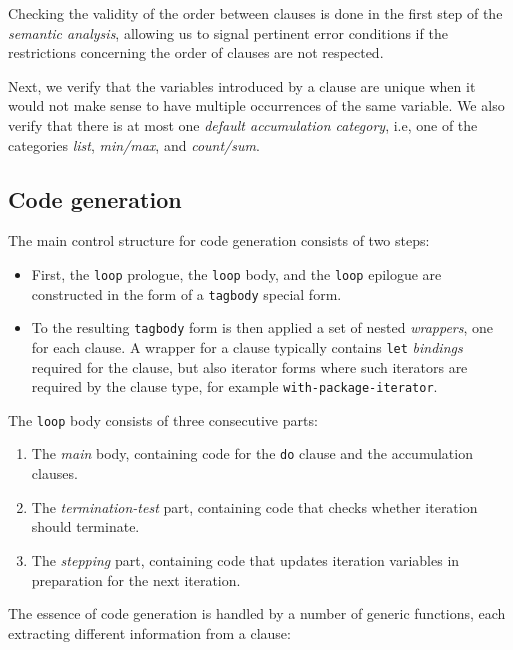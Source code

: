 Checking the validity of the order between clauses is done in the
first step of the \emph{semantic analysis}, allowing us to signal
pertinent error conditions if the restrictions concerning the order of
clauses are not respected.

Next, we verify that the variables introduced by a clause are unique
when it would not make sense to have multiple occurrences of the same
variable.  We also verify that there is at most one \emph{default
accumulation category}, i.e, one of the categories \emph{list},
\emph{min/max}, and \emph{count/sum}.

\subsection{Code generation}
\label{sec-our-technique-code generation}

The main control structure for code generation consists of two steps:

\begin{itemize}
\item First, the \texttt{loop} prologue, the \texttt{loop} body, and
  the \texttt{loop} epilogue are constructed in the form of a
  \texttt{tagbody} special form.
\item To the resulting \texttt{tagbody} form is then applied a set of
  nested \emph{wrappers}, one for each clause.  A wrapper for a clause
  typically contains \texttt{let} \emph{bindings} required for the
  clause, but also iterator forms where such iterators are required by
  the clause type, for example \texttt{with-package-iterator}.
\end{itemize}

The \texttt{loop} body consists of three consecutive parts:

\begin{enumerate}
\item The \emph{main} body, containing code for the \texttt{do} clause
  and the accumulation clauses.
\item The \emph{termination-test} part, containing code that checks
  whether iteration should terminate.
\item The \emph{stepping} part, containing code that updates iteration
  variables in preparation for the next iteration.
\end{enumerate}

The essence of code generation is handled by a number of generic
functions, each extracting different information from a clause:

